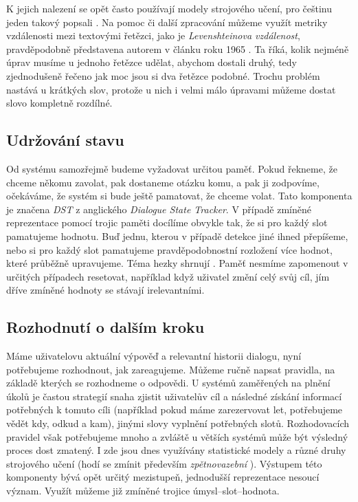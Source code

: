 K jejich nalezení se opět často používají modely strojového učení, pro češtinu
jeden takový popsali \citet{ekstein_czech_2019}. Na pomoc či další zpracování
můžeme využít metriky vzdálenosti mezi textovými řetězci,
jako je \textit{Levenshteinova vzdálenost}, pravděpodobně představena autorem v
článku roku 1965 \citep{Levenshtein1965BinaryCC}. Ta říká, kolik nejméně úprav
musíme u jednoho řetězce udělat, abychom dostali druhý, tedy zjednodušeně řečeno
jak moc jsou si dva řetězce podobné. Trochu problém nastává u krátkých slov,
protože u nich i velmi málo úpravami můžeme dostat slovo kompletně rozdílné.

\subsection{Udržování stavu}\label{dst}

Od systému samozřejmě budeme vyžadovat určitou paměť. Pokud řekneme, že
chceme někomu zavolat, pak dostaneme otázku komu, a pak ji zodpovíme, očekáváme,
že systém si bude ještě pamatovat, že chceme volat. Tato komponenta je
značena \textit{DST} z anglického \textit{Dialogue State Tracker}. V případě
zmíněné reprezentace pomocí trojic paměti docílíme obvykle tak, že si pro každý
slot pamatujeme hodnotu. Buď jednu, kterou v případě detekce jiné ihned přepíšeme,
nebo si pro každý slot pamatujeme pravděpodobnostní rozložení více hodnot, které
průběžně upravujeme. Téma hezky shrnují \citet{williams_dialog_2016}.
Paměť nesmíme zapomenout v určitých případech
resetovat, například když uživatel změní celý svůj cíl, jím dříve
zmíněné hodnoty se stávají irelevantními.

\subsection{Rozhodnutí o dalším kroku}\label{dp}

Máme uživatelovu aktuální výpověď a relevantní historii dialogu, nyní potřebujeme
rozhodnout, jak zareagujeme. Můžeme ručně napsat pravidla, na základě kterých
se rozhodneme o odpovědi. U systémů zaměřených na plnění úkolů je častou
strategií snaha zjistit uživatelův cíl a následné získání informací potřebných
k tomuto cíli (například pokud máme zarezervovat let, potřebujeme vědět kdy,
odkud a kam), jinými slovy vyplnění potřebných slotů. Rozhodovacích pravidel
však potřebujeme mnoho a zvláště u větších systémů může být výsledný proces dost
zmatený. I zde jsou dnes využívány statistické modely a různé druhy strojového
učení (hodí se zmínit především \textit{zpětnovazební} \citep{su_reward_2015}). Výstupem této komponenty
bývá opět určitý mezistupeň, jednodušší reprezentace nesoucí význam. Využít
můžeme již zmíněné trojice úmysl--slot--hodnota.

